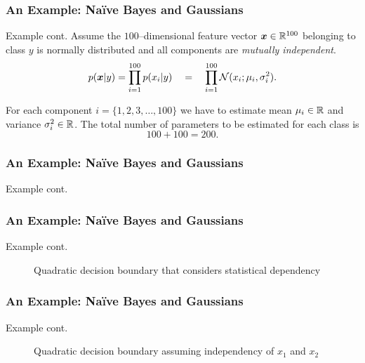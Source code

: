 \begin{frame}
  \frametitle{An Example: Na{\"i}ve Bayes and Gaussians \cont}

  \begin{ovalblock}{Example cont.}
    Assume the $100$--dimensional feature vector $\vec x\in \real^{100}$ belonging to class $y$ is normally distributed and all components are \emph{mutually independent}. 
    \begin{displaymath}
      p(\vec x| y) = \prod_{i=1}^{100} p(x_i | y) \quad = \quad \prod_{i=1}^{100} {\cal N}(x_i;\mu_i, \sigma^2_i).
    \end{displaymath}
 
    For each component $i=\{1,2,3,\dots, 100\}$ we have to estimate mean $\mu_i\in \real$ and variance $\sigma_i^2\in \real$.
    The total number of parameters to be estimated for each class is \pause $$100+100= 200.$$
  \end{ovalblock}
\end{frame}


\begin{frame}
   \frametitle{An Example: Na{\"i}ve Bayes and Gaussians \cont}

  \begin{ovalblock}{Example cont.}
    \begin{figure}
      \resizebox{.75\linewidth}{!}{
        
      }
   \end{figure}
 \end{ovalblock}
\end{frame}


\begin{frame}
  \frametitle{An Example: Na{\"i}ve Bayes and Gaussians \cont}
  
  \begin{ovalblock}{Example cont.}
    \begin{figure}
      \resizebox{.5\linewidth}{!}{
        
      }
      \caption{Quadratic decision boundary that considers statistical dependency}
   \end{figure}
   \end{ovalblock}
 \end{frame}
 
 
\begin{frame}
  \frametitle{An Example: Na{\"i}ve Bayes and Gaussians \cont}

  \begin{ovalblock} {Example cont.}
    \begin{figure}
      \resizebox{.5\linewidth}{!}{
        
      }      
      \caption{Quadratic decision boundary assuming independency of $x_1$ and $x_2$}
    \end{figure}
  \end{ovalblock}
\end{frame}


